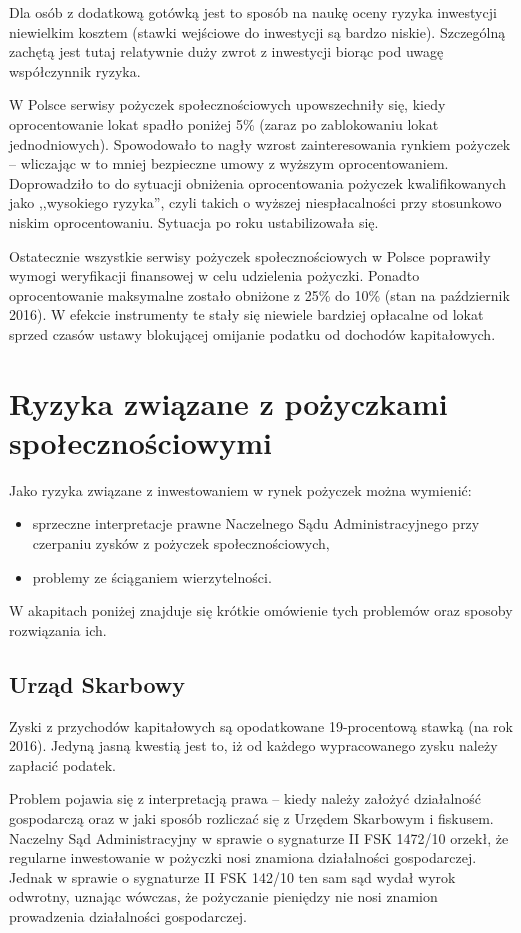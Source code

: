 \documentclass[a4paper,twoside,titlepage,openright]{book}
\begin{document}
Dla osób z dodatkową gotówką jest to sposób na naukę oceny ryzyka inwestycji niewielkim kosztem (stawki wejściowe do inwestycji są bardzo niskie). Szczególną zachętą jest tutaj relatywnie duży zwrot z inwestycji biorąc pod uwagę współczynnik ryzyka. 

W Polsce serwisy pożyczek społecznościowych upowszechniły się, kiedy oprocentowanie lokat spadło poniżej 5\% (zaraz po zablokowaniu lokat jednodniowych).\cite{antybelkowe} Spowodowało to nagły wzrost zainteresowania rynkiem pożyczek -- wliczając w to mniej bezpieczne umowy z wyższym oprocentowaniem. Doprowadziło to do sytuacji obniżenia oprocentowania pożyczek kwalifikowanych jako ,,wysokiego ryzyka'', czyli takich o wyższej niespłacalności przy stosunkowo niskim oprocentowaniu. Sytuacja po roku ustabilizowała się. 

Ostatecznie wszystkie serwisy pożyczek społecznościowych w Polsce poprawiły wymogi weryfikacji finansowej w celu udzielenia pożyczki. Ponadto oprocentowanie maksymalne zostało obniżone z 25\% do 10\% (stan na październik 2016). W efekcie instrumenty te stały się niewiele bardziej opłacalne od lokat sprzed czasów ustawy blokującej omijanie podatku od dochodów kapitałowych.
 
 
\section{Ryzyka związane z pożyczkami społecznościowymi}

Jako ryzyka związane z inwestowaniem w rynek pożyczek można wymienić:

\begin{itemize}
\item sprzeczne interpretacje prawne Naczelnego Sądu Administracyjnego przy czerpaniu zysków z pożyczek społecznościowych,
\item problemy ze ściąganiem wierzytelności.
\end{itemize}

W akapitach poniżej znajduje się krótkie omówienie tych problemów oraz sposoby rozwiązania ich.

\subsection*{Urząd Skarbowy}
Zyski z przychodów kapitałowych są opodatkowane 19-procentową stawką (na rok 2016). Jedyną jasną kwestią jest to, iż od każdego wypracowanego zysku należy zapłacić podatek. 

Problem pojawia się z interpretacją prawa -- kiedy należy założyć działalność gospodarczą oraz w jaki sposób rozliczać się z Urzędem Skarbowym i fiskusem. Naczelny Sąd Administracyjny w sprawie o sygnaturze II FSK 1472/10 orzekł, że regularne inwestowanie w pożyczki nosi znamiona działalności gospodarczej.\cite{nsaZnamiona} Jednak w sprawie o sygnaturze II FSK 142/10 ten sam sąd wydał wyrok odwrotny, uznając wówczas, że pożyczanie pieniędzy nie nosi znamion prowadzenia działalności gospodarczej. \cite{nsaWyrokOdwrotny} 
\end{document}
